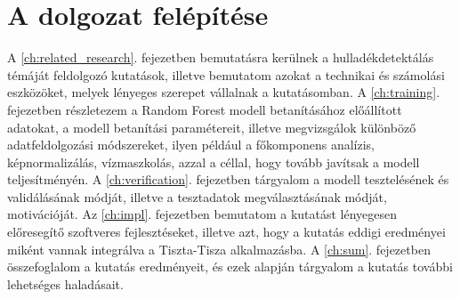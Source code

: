 \section{A dolgozat felépítése}
A \ref{ch:related_research}. fejezetben bemutatásra kerülnek a hulladékdetektálás témáját feldolgozó kutatások, illetve bemutatom azokat a technikai és számolási eszközöket, melyek lényeges szerepet vállalnak a kutatásomban.
A \ref{ch:training}. fejezetben részletezem a Random Forest modell betanításához előállított adatokat, a modell betanítási paramétereit, illetve megvizsgálok különböző adatfeldolgozási módszereket, ilyen például a főkomponens analízis, képnormalizálás, vízmaszkolás, azzal a céllal, hogy tovább javítsak a modell teljesítményén. A \ref{ch:verification}. fejezetben tárgyalom a modell tesztelésének és validálásának módját, illetve a tesztadatok megválasztásának módját, motivációját. Az \ref{ch:impl}. fejezetben bemutatom a kutatást lényegesen előresegítő szoftveres fejlesztéseket, illetve azt, hogy a kutatás eddigi eredményei miként vannak integrálva a Tiszta-Tisza alkalmazásba. A \ref{ch:sum}. fejezetben összefoglalom a kutatás eredményeit, és ezek alapján tárgyalom a kutatás további lehetséges haladásait. 